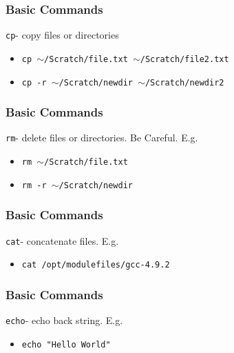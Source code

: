 \documentclass{beamer}
\newcommand{\code}[1]{\colorbox{codegray}{\texttt{#1}}}
\begin{document}
\begin{frame}
\frametitle{Basic Commands}
\code{cp}- copy files or directories
\bigskip
\begin{itemize}
    \item \code{cp $\sim$/Scratch/file.txt $\sim$/Scratch/file2.txt}
    \bigskip
    \item \code{cp -r $\sim$/Scratch/newdir $\sim$/Scratch/newdir2}
\end{itemize}
\end{frame}


\begin{frame}
\frametitle{Basic Commands}
\code{rm}- delete files or directories. Be Careful. E.g.
\bigskip
\begin{itemize}
    \item \code{rm $\sim$/Scratch/file.txt}
    \bigskip
    \item \code{rm -r $\sim$/Scratch/newdir}
\end{itemize}
\end{frame}


\begin{frame}
\frametitle{Basic Commands}
\code{cat}- concatenate files. E.g.
\bigskip
\begin{itemize}
    \item \code{cat /opt/modulefiles/gcc-4.9.2}
\end{itemize}
\end{frame}


\begin{frame}
\frametitle{Basic Commands}
\code{echo}- echo back string. E.g.
\bigskip
\begin{itemize}
    \item \code{echo "Hello World"}
\end{itemize}
\end{frame}
\end{document}
